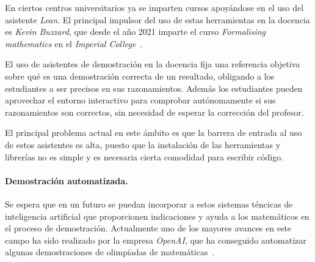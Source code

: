 En ciertos centros universitarios ya se imparten cursos apoyándose en el uso del
asistente \textit{Lean}. El principal impulsor del uso de estas herramientas en
la docencia es \textit{Kevin Buzzard}, que desde el año 2021 imparte el curso
\textit{Formalising mathematics} en el \textit{Imperial
	College}~\cite{buzzardFormalisingMathematicsFormalising}.

El uso de asistentes de demostración en la docencia fija una referencia objetiva
sobre qué es una demostración correcta de un resultado, obligando a los
estudiantes a ser precisos en sus razonamientos. Además los estudiantes pueden
aprovechar el entorno interactivo para comprobar autónomamente si sus
razonamientos son correctos, sin necesidad de esperar la corrección del
profesor.

El principal problema actual en este ámbito es que la barrera de entrada al uso
de estos asistentes es alta, puesto que la instalación de las herramientas y
librerías no es simple y es necesaria cierta comodidad para escribir código.



\paragraph{Demostración automatizada.} Se espera que en un
futuro se puedan incorporar a estos sistemas téncicas de inteligencia artificial
que proporcionen indicaciones y ayuda a los matemáticos en el proceso de
demostración. Actualmente uno de los mayores avances en este campo ha sido
realizado por la empresa \textit{OpenAI}, que ha conseguido automatizar algunas
demostraciones de olimpíadas de matemáticas~\cite{poluSolvingFormalMath}.


